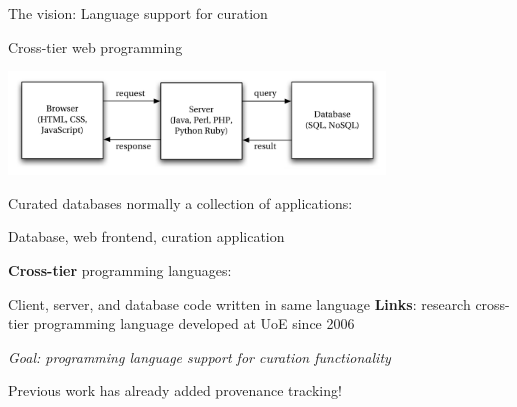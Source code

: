 \documentclass[11.5pt, aspectratio=169]{beamer}
\begin{document}
\begin{frame}{The vision: Language support for curation}
\end{frame}

\begin{frame}{Cross-tier web programming}

  \begin{center}
    \includegraphics[width=0.75\textwidth]{images/3tier.pdf}
  \end{center}

  \begin{fullpageitemize}
  \item Curated databases normally a collection of applications:
    \begin{itemize}
      \itemR Database, web frontend, curation application
    \end{itemize}
    \vspace{1em}
  \item \textbf{Cross-tier} programming languages:
    \begin{itemize}
      \itemR Client, server, and database code written in same language
      \itemR \textbf{Links}: research cross-tier programming language developed
        at UoE since 2006
    \end{itemize}
    \vspace{1em}
  \item \emph{Goal: programming language support for curation functionality}
    \begin{itemize}
      \itemR Previous work has already added provenance tracking!
    \end{itemize}
  \end{fullpageitemize}
\end{frame}
\end{document}
